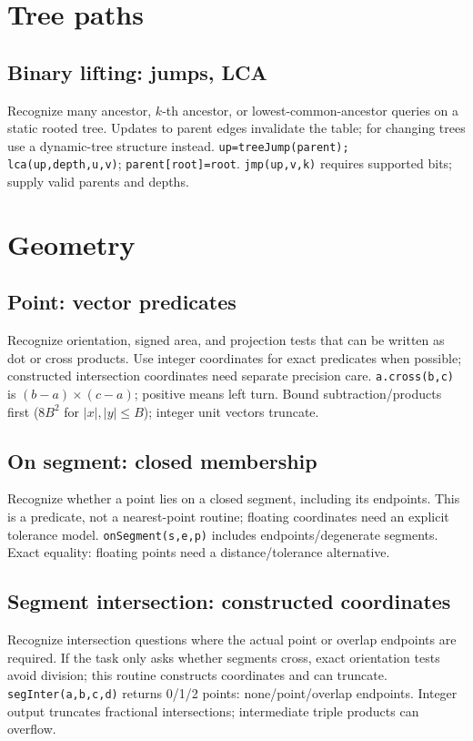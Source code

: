 \section{Tree paths}
\subsection{Binary lifting: jumps, LCA}
Recognize many ancestor, $k$-th ancestor, or lowest-common-ancestor queries
on a static rooted tree. Updates to parent edges invalidate the table; for
changing trees use a dynamic-tree structure instead.
\texttt{up=treeJump(parent); lca(up,depth,u,v)}; \texttt{parent[root]=root}.
\texttt{jmp(up,v,k)} requires supported bits; supply valid parents and depths.

\section{Geometry}
\subsection{Point: vector predicates}
Recognize orientation, signed area, and projection tests that can be written
as dot or cross products. Use integer coordinates for exact predicates when
possible; constructed intersection coordinates need separate precision care.
\texttt{a.cross(b,c)} is $(b-a)\times(c-a)$; positive means left turn.
Bound subtraction/products first ($8B^2$ for $|x|,|y|\le B$); integer unit vectors truncate.

\subsection{On segment: closed membership}
Recognize whether a point lies on a closed segment, including its endpoints.
This is a predicate, not a nearest-point routine; floating coordinates need
an explicit tolerance model.
\texttt{onSegment(s,e,p)} includes endpoints/degenerate segments.
Exact equality: floating points need a distance/tolerance alternative.

\subsection{Segment intersection: constructed coordinates}
Recognize intersection questions where the actual point or overlap endpoints
are required. If the task only asks whether segments cross, exact orientation
tests avoid division; this routine constructs coordinates and can truncate.
\texttt{segInter(a,b,c,d)} returns 0/1/2 points: none/point/overlap endpoints.
Integer output truncates fractional intersections; intermediate triple products can overflow.

